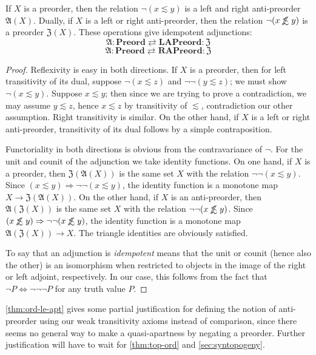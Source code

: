 \documentclass{article}
\def\oapt{\mathrel{\!\not\,\not\lesssim}}
\def\leapx{\lesssim}
\let\implies\Rightarrow
\def\anti{\mathfrak{A}}
\def\neigh{\mathfrak{Z}}
\def\Preord{\mathbf{Preord}}
\def\LAPreord{\mathbf{LAPreord}}
\def\RAPreord{\mathbf{RAPreord}}
\begin{document}
\begin{thm}\label{thm:ord-le-apt}
  If $X$ is a preorder, then the relation $\neg(x\leapx y)$ is a left and right anti-preorder $\anti(X)$.
  Dually, if $X$ is a left or right anti-preorder, then the relation $\neg(x\oapt y)$ is a preorder $\neigh(X)$.
  These operations give idempotent adjunctions:
  \[\anti : \Preord \rightleftarrows \LAPreord : \neigh\]
  \[\anti : \Preord \rightleftarrows \RAPreord : \neigh\]
\end{thm}
\begin{proof}
  Reflexivity is easy in both directions.
  If $X$ is a preorder, then for left transitivity of its dual, suppose $\neg(x\leapx z)$ and $\neg\neg(y\leapx z)$; we must show $\neg(x\leapx y)$.
  Suppose $x\leapx y$; then since we are trying to prove a contradiction, we may assume $y\leapx z$, hence $x\leapx z$ by transitivity of $\leapx$, contradiction our other assumption.
  Right transitivity is similar.
  On the other hand, if $X$ is a left or right anti-preorder, transitivity of its dual follows by a simple contraposition.

  Functoriality in both directions is obvious from the contravariance of $\neg$.
  For the unit and counit of the adjunction we take identity functions.
  On one hand, if $X$ is a preorder, then $\neigh(\anti(X))$ is the same set $X$ with the relation $\neg\neg(x\leapx y)$.
  Since $(x\leapx y) \implies \neg\neg(x\leapx y)$, the identity function is a monotone map $X\to \neigh(\anti(X))$.
  On the other hand, if $X$ is an anti-preorder, then $\anti(\neigh(X))$ is the same set $X$ with the relation $\neg\neg(x\oapt y)$.
  Since $(x\oapt y) \implies \neg\neg(x\oapt y)$, the identity function is a monotone map $\anti(\neigh(X)) \to X$.
  The triangle identities are obviously satisfied.

  To say that an adjunction is \emph{idempotent} means that the unit or counit (hence also the other) is an isomorphism when restricted to objects in the image of the right or left adjoint, respectively.
  In our case, this follows from the fact that $\neg P \iff \neg\neg\neg P$ for any truth value $P$.
\end{proof}

\cref{thm:ord-le-apt} gives some partial justification for defining the notion of anti-preorder using our weak transitivity axioms instead of comparison, since there seems no general way to make a quasi-apartness by negating a preorder.
Further justification will have to wait for \cref{thm:top-ord} and \cref{sec:syntopogeny}.
\end{document}
